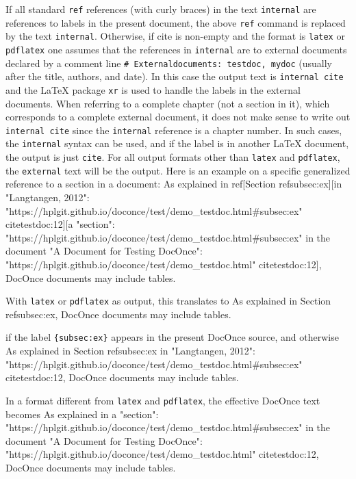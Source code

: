 \documentclass[%
oneside,                 %
final,                   %
chapterprefix=true,      %
open=right,              %
10pt]{book}
\begin{document}
\eccq

If all standard \texttt{ref} references (with curly braces)
in the text \texttt{internal} are references
to labels in the present document, the above \texttt{ref} command is replaced
by the text \texttt{internal}. Otherwise, if cite is non-empty and the format
is \texttt{latex} or \texttt{pdflatex} one assumes that the references in \texttt{internal}
are to external documents declared by a comment line \Verb!# Externaldocuments: testdoc, mydoc! (usually after the title, authors,
and date). In this case the output text is \texttt{internal cite} and the
{\LaTeX} package \texttt{xr} is used to handle the labels in the external documents.
When referring to a complete chapter (not a section in it), which
corresponds to a complete external document, it does not make sense
to write out \texttt{internal cite} since the \texttt{internal} reference is a
chapter number. In such cases, the \texttt{internal} syntax can be used,
and if the label is in another {\LaTeX} document, the output is just \texttt{cite}.
For all
output formats other than \texttt{latex} and \texttt{pdflatex}, the \texttt{external}
text will be the output.
Here is an example on a specific generalized reference to a section
in a document:
\bccq
As explained in
ref[Section ref{subsec:ex}][in "Langtangen, 2012":
"https://hplgit.github.io/doconce/test/demo_testdoc.html#subsec:ex"
cite{testdoc:12}][a "section":
"https://hplgit.github.io/doconce/test/demo_testdoc.html#subsec:ex" in
the document "A Document for Testing DocOnce":
"https://hplgit.github.io/doconce/test/demo_testdoc.html"
cite{testdoc:12}], DocOnce documents may include tables.

\eccq

With \texttt{latex} or \texttt{pdflatex} as output, this translates to
\bccq
As explained in
Section ref{subsec:ex}, DocOnce documents may include tables.

\eccq

if the label \Verb!{subsec:ex}! appears in the present DocOnce source, and
otherwise
\bccq
As explained in
Section ref{subsec:ex} in "Langtangen, 2012":
"https://hplgit.github.io/doconce/test/demo_testdoc.html#subsec:ex"
cite{testdoc:12}, DocOnce documents may include tables.

\eccq

In a format different from \texttt{latex} and \texttt{pdflatex}, the effective DocOnce
text becomes
\bccq
As explained in
a "section":
"https://hplgit.github.io/doconce/test/demo_testdoc.html#subsec:ex" in
the document "A Document for Testing DocOnce":
"https://hplgit.github.io/doconce/test/demo_testdoc.html"
cite{testdoc:12}, DocOnce documents may include tables.
\end{document}
